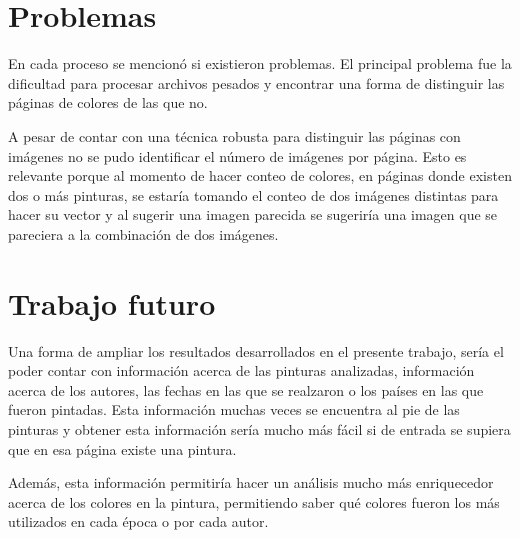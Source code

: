 \section{Problemas}

 En cada proceso se mencionó si existieron problemas. El principal problema  fue la dificultad 
 para procesar archivos pesados y  encontrar una forma de distinguir las páginas de colores de las que no. 
 
 A pesar de contar con una técnica robusta para distinguir  las páginas con imágenes no se pudo identificar el número de imágenes por página. Esto es relevante porque al momento de hacer conteo de colores, en páginas donde existen dos o más pinturas, se estaría  tomando el conteo de dos imágenes distintas para hacer su vector y al sugerir una imagen parecida se sugeriría  una imagen que se pareciera a la combinación de dos imágenes.

\section{Trabajo futuro}

Una forma de ampliar los resultados desarrollados en el presente trabajo, sería el poder contar con información acerca de las pinturas analizadas, información acerca de los autores, las fechas en las que se realzaron o los países en las que fueron pintadas. Esta información muchas veces se encuentra al pie de las pinturas y obtener esta información sería mucho más fácil si de entrada se supiera que en esa página existe una pintura.

Además, esta información permitiría hacer un análisis mucho más enriquecedor acerca de los colores en la pintura, permitiendo saber qué colores fueron los más utilizados en cada época o por cada autor.